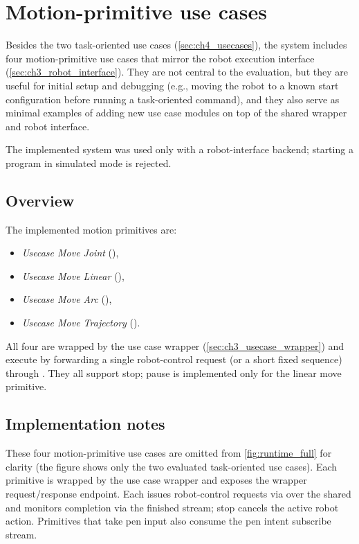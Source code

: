 \section{Motion-primitive use cases}
\label{sec:ch4_usecases_primitives}

Besides the two task-oriented use cases (\autoref{sec:ch4_usecases}), the system includes four motion-primitive use cases that mirror the robot execution interface (\autoref{sec:ch3_robot_interface}).
They are not central to the evaluation, but they are useful for initial setup and debugging (e.g., moving the robot to a known start configuration before running a task-oriented command), and they also serve as minimal examples of adding new use case modules on top of the shared wrapper and robot interface.

The implemented system was used only with a robot-interface backend; starting a program in simulated mode is rejected.

\subsection{Overview}
\label{subsec:ch4_usecases_primitives_overview}

The implemented motion primitives are:
\begin{itemize}[nosep]
    \item \emph{Usecase Move Joint} (),
    \item \emph{Usecase Move Linear} (),
    \item \emph{Usecase Move Arc} (),
    \item \emph{Usecase Move Trajectory} ().
\end{itemize}
All four are wrapped by the use case wrapper (\autoref{sec:ch3_usecase_wrapper}) and execute by forwarding a single robot-control request (or a short fixed sequence) through .
They all support stop; pause is implemented only for the linear move primitive.

\subsection{Implementation notes}
\label{subsec:ch4_usecases_primitives_impl}

These four motion-primitive use cases are omitted from \autoref{fig:runtime_full} for clarity (the figure shows only the two evaluated task-oriented use cases).
Each primitive is wrapped by the use case wrapper and exposes the wrapper request/response endpoint.
Each issues robot-control requests via  over the shared  and monitors completion via the finished stream; stop cancels the active robot action.
Primitives that take pen input also consume the pen intent subscribe stream.

